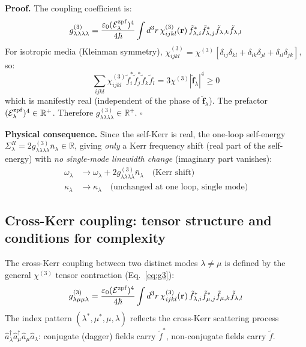 \documentclass[12pt]{article}
\newcommand{\zpf}{{\rm zpf}}
\newcommand{\tf}{\tilde{\mathbf{f}}}
\begin{document}
\textbf{Proof.}  The coupling coefficient is:
\begin{equation}
  g^{(3)}_{\lambda\lambda\lambda\lambda} =
  \frac{\varepsilon_0(\mathcal{E}_\lambda^\zpf)^4}{4\hbar}
  \int d^3r\,\chi^{(3)}_{ijkl}(\mathbf{r})\,
  \tilde{f}_{\lambda,i}^*\tilde{f}_{\lambda,j}^*
  \tilde{f}_{\lambda,k}\tilde{f}_{\lambda,l}
  \label{eq:selfkerr_formula}
\end{equation}
For isotropic media (Kleinman symmetry),
$\chi^{(3)}_{ijkl}=\chi^{(3)}[\delta_{ij}\delta_{kl}
+\delta_{ik}\delta_{jl}+\delta_{il}\delta_{jk}]$, so:
\begin{equation}
  \sum_{ijkl}\chi^{(3)}_{ijkl}
  \tilde{f}_i^*\tilde{f}_j^*\tilde{f}_k\tilde{f}_l
  = 3\chi^{(3)}|\tilde{\mathbf{f}}_\lambda|^4 \geq 0
  \label{eq:iso_selfkerr}
\end{equation}
which is manifestly real (independent of the phase of $\tf_\lambda$).
The prefactor $(\mathcal{E}_\lambda^\zpf)^4\in\mathbb{R}^+$.  Therefore
$g^{(3)}_{\lambda\lambda\lambda\lambda}\in\mathbb{R}^+$. $\square$

\textbf{Physical consequence.}  Since the self-Kerr is real, the
one-loop self-energy
$\Sigma^R_\lambda = 2g^{(3)}_{\lambda\lambda\lambda\lambda}\bar{n}_\lambda
\in\mathbb{R}$, giving \emph{only} a Kerr frequency shift (real part
of the self-energy) with \emph{no single-mode linewidth change}
(imaginary part vanishes):
\begin{align}
  \omega_\lambda &\to \omega_\lambda
  +2g^{(3)}_{\lambda\lambda\lambda\lambda}\bar{n}_\lambda
  \quad\text{(Kerr shift)}\\
  \kappa_\lambda &\to \kappa_\lambda
  \quad\text{(unchanged at one loop, single mode)}
\end{align}

\subsection{Cross-Kerr coupling: tensor structure and conditions for complexity}
\label{sec:crosskerr}

The cross-Kerr coupling between two distinct modes $\lambda\neq\mu$
is defined by the general $\chi^{(3)}$ tensor contraction
(Eq.~\ref{eq:g3}):
\begin{equation}
  g^{(3)}_{\lambda\mu\mu\lambda} =
  \frac{\varepsilon_0(\mathcal{E}^\zpf)^4}{4\hbar}
  \int d^3r\,\chi^{(3)}_{ijkl}(\mathbf{r})\,
  \tilde{f}^*_{\lambda,i}\tilde{f}^*_{\mu,j}
  \tilde{f}_{\mu,k}\tilde{f}_{\lambda,l}
  \label{eq:crosskerr}
\end{equation}
The index pattern $(\lambda^*,\mu^*,\mu,\lambda)$ reflects the
cross-Kerr scattering process $\hat{a}^\dagger_\lambda\hat{a}^\dagger_\mu
\hat{a}_\mu\hat{a}_\lambda$: conjugate (dagger) fields carry $\tilde{f}^*$,
non-conjugate fields carry $\tilde{f}$.
\end{document}
